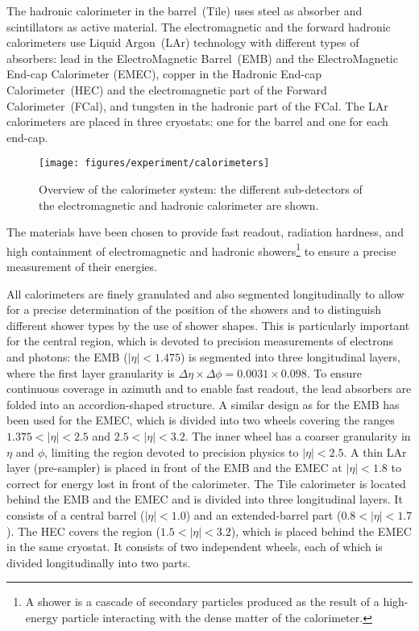The hadronic calorimeter in the barrel~(Tile) uses steel as absorber
and scintillators as active material.
The electromagnetic and the forward hadronic calorimeters use Liquid
Argon~(LAr) technology with different types of absorbers:
lead in the ElectroMagnetic Barrel~(EMB) and the ElectroMagnetic
End-cap Calorimeter (EMEC), copper in the Hadronic End-cap
Calorimeter~(HEC) and the electromagnetic part of the Forward
Calorimeter~(FCal), and tungsten in the hadronic part of the FCal.
The LAr calorimeters are placed in three cryostats: one for the barrel
and one for each end-cap.
\begin{figure}[ht]
\begin{center}
\texttt{[image: figures/experiment/calorimeters]}
\caption[Overview of the calorimeter system]{
  Overview of the calorimeter system:
  the different sub-detectors of the electromagnetic and hadronic calorimeter are shown.}
\label{fig:calorimeters}
\end{center}
\end{figure}
The materials have been chosen to provide fast readout, 
radiation hardness, and high containment of electromagnetic and
hadronic showers\footnote{A shower is a cascade of secondary particles produced 
as the result of a high-energy particle interacting with the dense matter of the calorimeter.} 
to ensure a precise measurement of their energies.

All calorimeters are finely granulated and also segmented
longitudinally to allow for a precise determination of the position of the showers and to
distinguish different shower types by the use of shower shapes.
This is particularly important for the central region, 
which is devoted to precision measurements of electrons and photons:
the EMB (\mbox{$|\eta| < 1.475$}) is segmented into three longitudinal
layers, where the first layer granularity is
$\Delta\eta\times\Delta\phi=0.0031\times0.098$. 
To ensure continuous coverage in azimuth and to enable fast readout, 
the lead absorbers are folded into an accordion-shaped structure.
A similar design as for the EMB has been used for the EMEC, 
which is divided into two wheels covering the ranges \mbox{$1.375 < |\eta| < 2.5$}
and \mbox{$2.5 < |\eta| < 3.2$}.
The inner wheel has a coarser granularity in $\eta$ and $\phi$, 
limiting the region devoted to precision physics to \mbox{$|\eta| < 2.5$}.
A thin LAr layer (pre-sampler) is placed in front of the EMB and the
EMEC at \mbox{$|\eta| < 1.8$} to correct for energy lost in front of the calorimeter.
The Tile calorimeter is located behind the EMB and the EMEC and is
divided into three longitudinal layers. It consists of a central
barrel (\mbox{$|\eta| < 1.0$}) and an extended-barrel part (\mbox{$0.8
  < |\eta| < 1.7$}). 
The HEC covers the region (\mbox{$1.5 < |\eta| < 3.2$}), which is
placed behind the EMEC in the same cryostat. It consists of two
independent wheels, each of which is divided longitudinally into two
parts. 

